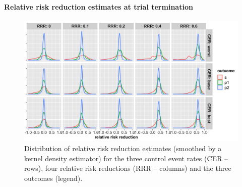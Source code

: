\documentclass[]{article}
\let\oldparagraph\paragraph
\renewcommand{\paragraph}[1]{\oldparagraph{#1}\mbox{}}
\begin{document}
\hypertarget{relative-risk-reduction-estimates-at-trial-termination-1}{%
\paragraph{Relative risk reduction estimates at trial
termination}\label{relative-risk-reduction-estimates-at-trial-termination-1}}

\begin{figure}
  \caption{Distribution of relative risk reduction estimates (smoothed by a kernel density estimator) for the three
  control event rates (CER – rows), four relative risk reductions (RRR – columns) and the three outcomes (legend).}
  \includegraphics{../p1_plots/batch_size_nb_2000/RRRhat_p1.png}
\end{figure}
\end{document}
